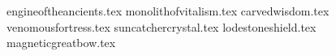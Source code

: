
\howdahspecification{}

\raggedcolumns
\begin{multicols}{2}
\startsortedpricelist
{engineoftheancients.tex}
{monolithofvitalism.tex}
{carvedwisdom.tex}
{venomousfortress.tex}
{suncatchercrystal.tex}
{lodestoneshield.tex}
{magneticgreatbow.tex}
\endsortedpricelist
\end{multicols}{}